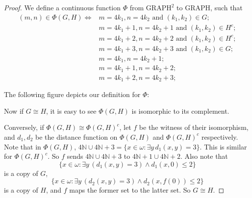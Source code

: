 \documentclass[10pt,a4paper]{amsart}
\def\graph{\mathrm{GRAPH}}
\begin{document}
\begin{proof}
    We define a continuous function $\Phi$ from $\graph^2$ to $\graph$, such that
    \begin{align*}
        (m,n) \in \Phi(G,H) \iff & m = 4k_1, n = 4k_2 \text{ and } (k_1,k_2) \in G; \\
        & m = 4k_1+1, n = 4k_2+1 \text{ and } (k_1,k_2) \in H^c; \\
        & m = 4k_1+2, n = 4k_2+2 \text{ and } (k_1,k_2) \in H^c; \\
        & m = 4k_1+3, n = 4k_2+3 \text{ and } (k_1,k_2) \in G; \\
        & m = 4k_1, n = 4k_2+1; \\
        & m = 4k_1+1, n = 4k_2+2; \\
        & m = 4k_1+2, n = 4k_2+3;
    \end{align*}

    The following figure depicts our definition for $\Phi$:
    \begin{figure}[htbp]
        \centering
    \end{figure}

    Now if $G \cong H$, it is easy to see $\Phi(G,H)$ is isomorphic to its complement.

    Conversely, if $\Phi(G,H) \cong \Phi(G,H)^c$, let $f$ be the witness of their isomorphism, and $d_1, d_2$ be the distance function on $\Phi(G,H)$ and $\Phi(G,H)^c$ respectively. Note that in $\Phi(G,H)$, $4\mathbb{N} \cup 4\mathbb{N}+3 = \{x \in \omega : \exists y \, d_1(x,y) = 3\}$. This is similar for $\Phi(G,H)^c$. So $f$ sends $4\mathbb{N} \cup 4\mathbb{N}+3$ to $4\mathbb{N}+1 \cup 4\mathbb{N}+2$. Also note that
    $$\{x \in \omega : \exists y \, (d_1(x,y) = 3) \land d_1(x,0) \leq 2\}$$
    is a copy of $G$,
    $$\{x \in \omega : \exists y \, (d_2(x,y) = 3) \land d_2(x,f(0)) \leq 2\}$$
    is a copy of $H$, and $f$ maps the former set to the latter set. So $G \cong H$.
\end{proof}
\end{document}
